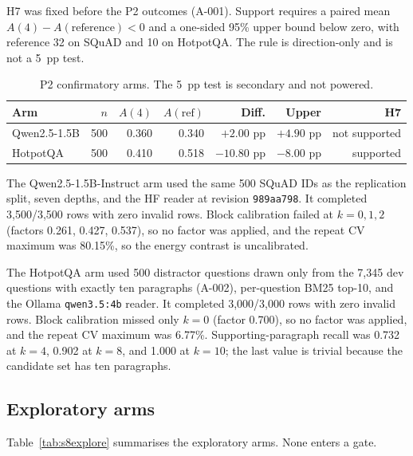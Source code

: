 \documentclass[a4paper,fleqn]{cas-sc}
\begin{document}
H7 was fixed before the P2 outcomes (A-001). Support requires a paired mean
$A(4)-A(\text{reference})<0$ and a one-sided 95\% upper bound below zero, with
reference 32 on SQuAD and 10 on HotpotQA. The rule is direction-only and is not a
5~pp test.

\begin{table}[pos=htbp]
  \centering
  \caption{P2 confirmatory arms. The 5~pp test is secondary and not powered.}
  \label{tab:s8confirm}
  \footnotesize
  \begin{tabular}{@{}lrrrrrr@{}}
    \toprule
    \textbf{Arm} & $n$ & $A(4)$ & $A(\text{ref})$ & \textbf{Diff.} & \textbf{Upper} & \textbf{H7} \\
    \midrule
    Qwen2.5-1.5B & 500 & 0.360 & 0.340 & $+2.00$ pp & $+4.90$ pp & not supported \\
    HotpotQA & 500 & 0.410 & 0.518 & $-10.80$ pp & $-8.00$ pp & supported \\
    \bottomrule
  \end{tabular}
\end{table}

The Qwen2.5-1.5B-Instruct arm used the same 500 SQuAD IDs as the replication
split, seven depths, and the HF reader at revision \texttt{989aa798}. It
completed 3{,}500/3{,}500 rows with zero invalid rows. Block calibration failed
at $k=0,1,2$ (factors 0.261, 0.427, 0.537), so no factor was applied, and the
repeat CV maximum was 80.15\%, so the energy contrast is uncalibrated.

The HotpotQA arm used 500 distractor questions drawn only from the 7{,}345 dev
questions with exactly ten paragraphs (A-002), per-question BM25 top-10, and the
Ollama \texttt{qwen3.5:4b} reader. It completed 3{,}000/3{,}000 rows with zero
invalid rows. Block calibration missed only $k=0$ (factor 0.700), so no factor
was applied, and the repeat CV maximum was 6.77\%. Supporting-paragraph recall
was 0.732 at $k=4$, 0.902 at $k=8$, and 1.000 at $k=10$; the last value is
trivial because the candidate set has ten paragraphs.

\subsection{Exploratory arms}

Table~\ref{tab:s8explore} summarises the exploratory arms. None enters a gate.
\end{document}
